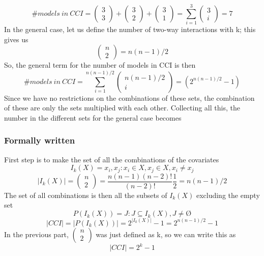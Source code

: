 \noindent 
\[\#models\ in\ CCI=\left( \begin{array}{c}
3 \\ 
3 \end{array}
\right)+\left( \begin{array}{c}
3 \\ 
2 \end{array}
\right)+\left( \begin{array}{c}
3 \\ 
1 \end{array}
\right)=\sum^3_{i=1}{\left( \begin{array}{c}
3 \\ 
i \end{array}
\right)}=7\] 
In the general case, let us define the number of two-way interactions with k; this gives us
\[\left( \begin{array}{c}
n \\ 
2 \end{array}
\right)=n(n-1)/2\] 
So, the general term for the number of models in CCI is then
\[\#models\ in\ CCI=\sum^{n(n-1)/2}_{i=1}{\left( \begin{array}{c}
n(n-1)/2 \\ 
i \end{array}
\right)}=(2^{n(n-1)/2}-1)\] 
Since we have no restrictions on the combinations of these sets, the combination of these are only the sets multiplied with each other. Collecting all this, the number in the different sets for the general case becomes

\subsubsection{Formally written}
First step is to make the set of all the combinations of the covariates
\[I_k\left(X\right)=\left.\left.x_i,x_j\right.:x_i\in X,x_j\in X,x_i\neq x_j\right.\] 
\[\left|I_k\left(X\right)\right|=\left( \begin{array}{c}
n \\ 
2 \end{array}
\right)=\frac{n\left(n-1\right)\left(n-2\right)!}{\left(n-2\right)!}\frac{1}{2}=n(n-1)/2\] 
The set of all combinations is then all the subsets of $I_k\left(X\right)$ excluding the empty set
\[P\left(I_k\left(X\right)\right)=\left.J:J\subseteq I_k\left(X\right),J\neq \textrm{\O}\right.\] 
\[\left|CCI\right|=\left|P\left(I_k\left(X\right)\right)\right|=2^{\left|I_k\left(X\right)\right|}-1=2^{n(n-1)/2}-1\] 
In the previous part, $\left( \begin{array}{c}
n \\ 
2 \end{array}
\right)$ was just defined as k, so we can write this as
\[\left|CCI\right|=2^k-1\] \\

